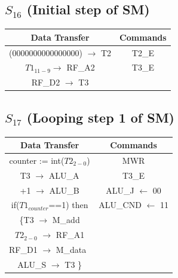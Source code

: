 \documentclass[]{report}
\begin{document}
            \subsection*{$S_{16}$ (Initial step of SM)} %
            \begin{center}
                \begin{tabular}{|c|c|}
                    \hline
                    Data Transfer & Commands \\
                    \hline
                    (0000000000000000) $\to$ T2 & T2\_E\\
                    $T1_{11-9} \to$ RF\_A2 & T3\_E\\
                    RF\_D2 $\to$ T3 & \\
                    \hline
                \end{tabular}
            \end{center}            
            \subsection*{$S_{17}$ (Looping step 1 of SM)} %
            \begin{center}
                \begin{tabular}{|c|c|}
                    \hline
                    Data Transfer & Commands \\
                    \hline
                    counter := int($T2_{2-0}$) & MWR\\
                    T3 $\to$ ALU\_A & T3\_E\\
                    +1 $\to$ ALU\_B & ALU\_J $\leftarrow$ 00\\
                    if($T1_{counter}$==1) then & ALU\_CND $\leftarrow$ 11\\
                    \{T3 $\to$ M\_add& \\
                    $T2_{2-0}$ $\to$ RF\_A1 & \\
                    RF\_D1 $\to$ M\_data\ & \\
                    ALU\_S $\to$ T3 \} & \\ 
                    \hline
                \end{tabular}
            \end{center} 
\end{document}
